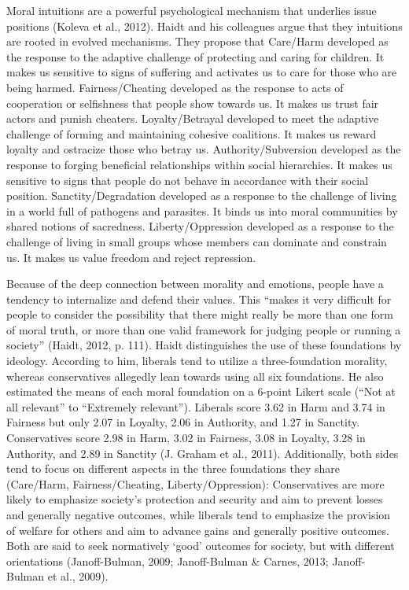 \documentclass[12pt,econ]{sources/authesis}
\begin{document}
Moral intuitions are a powerful psychological mechanism that underlies issue positions (Koleva et al., 2012). Haidt and his colleagues argue that they intuitions are rooted in evolved mechanisms. They propose that Care/Harm developed as the response to the adaptive challenge of protecting and caring for children. It makes us sensitive to signs of suffering and activates us to care for those who are being harmed. Fairness/Cheating developed as the response to acts of cooperation or selfishness that people show towards us. It makes us trust fair actors and punish cheaters. Loyalty/Betrayal developed to meet the adaptive challenge of forming and maintaining cohesive coalitions. It makes us reward loyalty and ostracize those who betray us. Authority/Subversion developed as the response to forging beneficial relationships within social hierarchies. It makes us sensitive to signs that people do not behave in accordance with their social position. Sanctity/Degradation developed as a response to the challenge of living in a world full of pathogens and parasites. It binds us into moral communities by shared notions of sacredness. Liberty/Oppression developed as a response to the challenge of living in small groups whose members can dominate and constrain us. It makes us value freedom and reject repression.

Because of the deep connection between morality and emotions, people have a tendency to internalize and defend their values. This ``makes it very difficult for people to consider the possibility that there might really be more than one form of moral truth, or more than one valid framework for judging people or running a society'' (Haidt, 2012, p. 111). Haidt distinguishes the use of these foundations by ideology. According to him, liberals tend to utilize a three-foundation morality, whereas conservatives allegedly lean towards using all six foundations. He also estimated the means of each moral foundation on a 6-point Likert scale (``Not at all relevant'' to ``Extremely relevant''). Liberals score 3.62 in Harm and 3.74 in Fairness but only 2.07 in Loyalty, 2.06 in Authority, and 1.27 in Sanctity. Conservatives score 2.98 in Harm, 3.02 in Fairness, 3.08 in Loyalty, 3.28 in Authority, and 2.89 in Sanctity (J. Graham et al., 2011). Additionally, both sides tend to focus on different aspects in the three foundations they share (Care/Harm, Fairness/Cheating, Liberty/Oppression): Conservatives are more likely to emphasize society's protection and security and aim to prevent losses and generally negative outcomes, while liberals tend to emphasize the provision of welfare for others and aim to advance gains and generally positive outcomes. Both are said to seek normatively `good' outcomes for society, but with different orientations (Janoff-Bulman, 2009; Janoff-Bulman \& Carnes, 2013; Janoff-Bulman et al., 2009).
\end{document}
